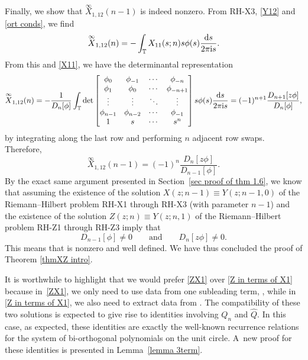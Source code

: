 \documentclass[10pt,a4paper]{amsart}
\numberwithin{equation}{section}
\newcommand{\T}{{\mathbb T}}
\newcommand{\ii}{{\rm i}}
\newcommand{\dd}{{\rm d}}
\newcommand{\qandq}{\qquad \text{and} \qquad}
\begin{document}
	Finally, we show that $\overset{\infty}{X}_{1,12}(n-1)$ is indeed nonzero. From {\rm RH-X3}, \eqref{Y12} and \eqref{ort conds}, we find
	\begin{equation*}
		\overset{\infty}{X}_{1,12}(n) = - 	\int_{\T} X_{11}(s;n)s\phi(s) \frac{\dd s}{2 \pi \ii s}.
	\end{equation*}
	From this and \eqref{X11}, we have the determinantal representation
	\begin{equation*}
		\overset{\infty}{X}_{1,12}(n) = - \frac{1}{D_n[\phi]}	\int_{\T} \det \begin{bmatrix}
			\phi_0 & \phi_{-1} & \cdots & \phi_{-n} \\
			\phi_1 & \phi_{0} & \cdots & \phi_{-n+1} \\
			\vdots & \vdots & \ddots & \vdots \\
			\phi_{n-1} & \phi_{n-2} & \cdots & \phi_{-1} \\
			1 & s & \cdots & s^n
		\end{bmatrix}s\phi(s) \frac{\dd s}{2 \pi \ii s} = (-1)^{n+1} \frac{D_{n+1}[z\phi]}{D_n[\phi]},
	\end{equation*} by integrating along the last row and performing $n$ adjacent row swaps. Therefore,
	\begin{equation*}
		\overset{\infty}{X}_{1,12}(n-1) = (-1)^{n} \frac{D_{n}[z\phi]}{D_{n-1}[\phi]}.
	\end{equation*}
	By the exact same argument presented in Section~\ref{sec proof of thm 1.6}, we know that assuming the existence of the solution $X(z;n-1) \equiv Y(z;n-1,0)$ of the Riemann--Hilbert problem {\rm RH-X1} through {\rm RH-X3} (with parameter $n-1$) and the existence of the solution $Z(z;n) \equiv Y(z;n,1)$ of the Riemann--Hilbert problem {\rm RH-Z1} through {\rm RH-Z3} imply that
	\begin{equation*}%
		D_{n-1}[\phi] \neq 0 \qandq D_n[z\phi] \neq 0.
	\end{equation*}
	This means that  is nonzero and well defined. We have thus concluded the proof of Theorem \ref{thmXZ intro}.
	\begin{Remark} 	It is worthwhile to highlight that we would prefer \eqref{ZX1} over \eqref{Z in terms of X1} because in~\eqref{ZX1}, we only need to use data from one subleading term, , while in \eqref{Z in terms of X1}, we also need to extract data from . The compatibility of these two solutions is expected to give rise to identities involving $Q_n$ and $\widehat{Q}$. In this case, as expected, these identities are exactly the well-known recurrence relations for the system of bi-orthogonal polynomials on the unit circle. A~new proof for these identities is presented in Lemma~\ref{lemma 3term}.
	\end{Remark}
	
\end{document}
